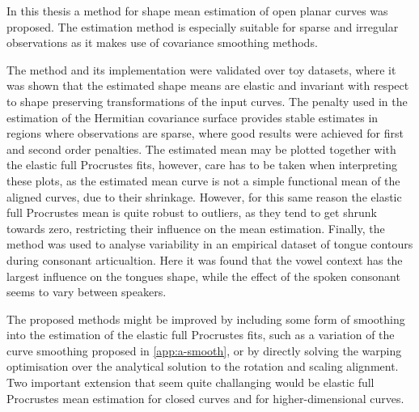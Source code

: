 \label{sec:5}
In this thesis a method for shape mean estimation of open planar curves was
proposed.
The estimation method is especially suitable for sparse and irregular
observations as it makes use of covariance smoothing methods.

The method and its implementation were validated over toy datasets, where it was
shown that the estimated shape means are elastic and invariant with respect to
shape preserving transformations of the input curves.
The penalty used in the estimation of the Hermitian covariance
surface provides stable estimates in regions where observations are sparse,
where good results were achieved for first and second order penalties.
The estimated mean may be plotted together with the elastic full Procrustes
fits, however, care has to be taken when interpreting these plots, as the
estimated mean curve is not a simple functional mean of the aligned curves, due to
their shrinkage.
However, for this same reason the elastic full Procrustes mean is quite robust to
outliers, as they tend to get shrunk towards zero, restricting their influence
on the mean estimation.
Finally, the method was used to analyse variability in an empirical dataset of
tongue contours during consonant articualtion.
Here it was found that the vowel context has the largest influence on the tongues
shape, while the effect of the spoken consonant seems to vary between speakers.

The proposed methods might be improved by including some form of smoothing into
the estimation of the elastic full Procrustes fits, such as a variation of the
curve smoothing proposed in \cref{app:a-smooth}, or by directly solving the
warping optimisation over the analytical solution to the rotation and scaling
alignment.
Two important extension that seem quite challanging would be elastic full Procrustes mean estimation for
closed curves and for higher-dimensional curves.

